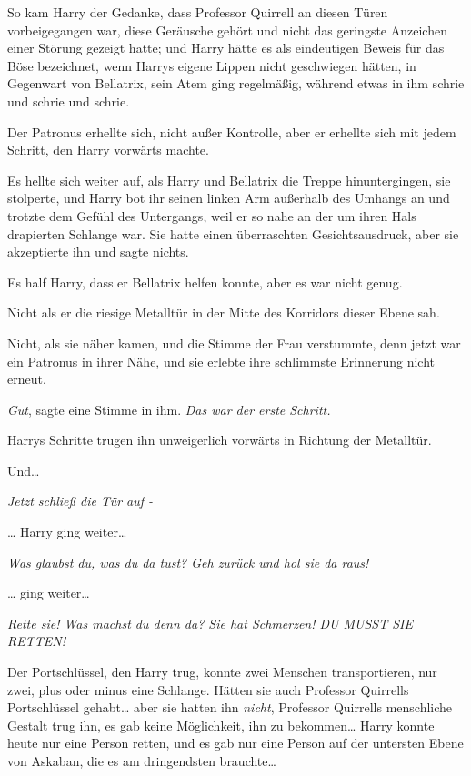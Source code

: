 {So kam Harry der Gedanke, dass Professor Quirrell an diesen Türen vorbeigegangen war, diese Geräusche gehört und nicht das geringste Anzeichen einer Störung gezeigt hatte; und Harry hätte es als eindeutigen Beweis für das Böse bezeichnet, wenn Harrys eigene Lippen nicht geschwiegen hätten, in Gegenwart von Bellatrix, sein Atem ging regelmäßig, während etwas in ihm schrie und schrie und schrie.

Der Patronus erhellte sich, nicht außer Kontrolle, aber er erhellte sich mit jedem Schritt, den Harry vorwärts machte.

Es hellte sich weiter auf, als Harry und Bellatrix die Treppe hinuntergingen, sie stolperte, und Harry bot ihr seinen linken Arm außerhalb des Umhangs an und trotzte dem Gefühl des Untergangs, weil er so nahe an der um ihren Hals drapierten Schlange war. Sie hatte einen überraschten Gesichtsausdruck, aber sie akzeptierte ihn und sagte nichts.

Es half Harry, dass er Bellatrix helfen konnte, aber es war nicht genug.

Nicht als er die riesige Metalltür in der Mitte des Korridors dieser Ebene sah.

Nicht, als sie näher kamen, und die Stimme der Frau verstummte, denn jetzt war ein Patronus in ihrer Nähe, und sie erlebte ihre schlimmste Erinnerung nicht erneut.

\emph{Gut}, sagte eine Stimme in ihm. \emph{Das war der erste Schritt.}

Harrys Schritte trugen ihn unweigerlich vorwärts in Richtung der Metalltür.

Und…

\emph{\emph{Jetzt schließ die Tür auf -}}

… Harry ging weiter…

\emph{\emph{Was glaubst du, was du da tust? Geh zurück und hol sie da raus!}}

… ging weiter…

\emph{\emph{Rette sie! Was machst du denn da? Sie hat Schmerzen! DU MUSST SIE RETTEN!}}

Der Portschlüssel, den Harry trug, konnte zwei Menschen transportieren, nur zwei, plus oder minus eine Schlange. Hätten sie auch Professor Quirrells Portschlüssel gehabt… aber sie hatten ihn \emph{nicht}, Professor Quirrells menschliche Gestalt trug ihn, es gab keine Möglichkeit, ihn zu bekommen… Harry konnte heute nur eine Person retten, und es gab nur eine Person auf der untersten Ebene von Askaban, die es am dringendsten brauchte…

}
